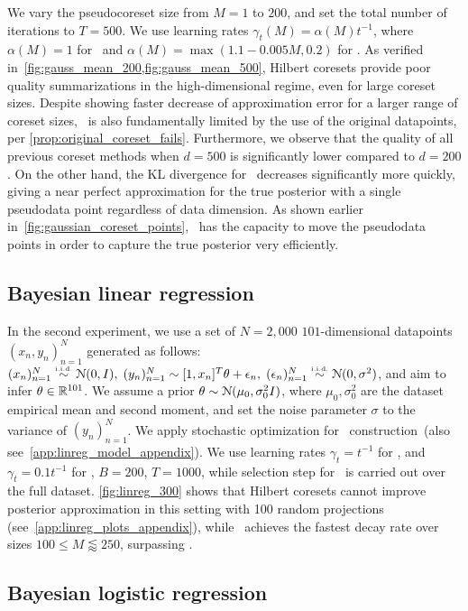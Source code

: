 %
We vary the pseudocoreset size from $M=1$ to $200$, and set the total number of
iterations to $ T =  500$. We use learning rates $ \gamma_t(M) = \alpha(M)
t^{-1}$, where  $ \alpha(M) = 1 $ for \sparsevi~and $ \alpha(M) = \max(1.1 - 0.005M, 0.2)
$ for \psvi.  As verified in~\cref{fig:gauss_mean_200,fig:gauss_mean_500},
Hilbert coresets provide poor quality summarizations in the high-dimensional
regime, even for large coreset sizes.  Despite showing faster decrease of
approximation error for a larger range of coreset sizes, \sparsevi~is also
fundamentally limited by the use of the original datapoints, per
\cref{prop:original_coreset_fails}.  Furthermore, we observe that the quality of all
previous coreset methods when $d=500$ is significantly lower
compared to $d=200$. On the other hand, the KL divergence for  \psvi~decreases
significantly more quickly, giving a near perfect approximation for the true
posterior with a single pseudodata point regardless of data dimension. As
shown earlier in~\cref{fig:gaussian_coreset_points}, \psvi~has the capacity to move the
pseudodata points in order to capture the
true posterior very efficiently. 

\subsection{Bayesian linear regression}
\label{section:linreg_experiment}
In the second experiment, we use a set of ${N=2,000}$ 
$101$-dimensional datapoints $(x_n,y_n)_{n=1}^{N}$ generated as follows: $(x_n)_{n=1}^N  \distiid \distNorm(0, I),\; (y_n)_{n=1}^N  \dist [1, x_n]^T\theta + \epsilon_n,\;  (\epsilon_n)_{n=1}^{N} \distiid \distNorm(0, \sigma^2)$, and aim to infer $\theta \in \mathbb{R}^{101}$. We assume a prior $\theta \sim \mathcal{N}(\mu_0,\sigma_0^2 I)$, where $ \mu_0, \sigma_0^2$ are the dataset empirical mean and second moment, and set the noise parameter $ \sigma$ to the variance of $(y_n)_{n=1}^{N}$. We apply stochastic optimization for \psvi~construction~(also see~\cref{app:linreg_model_appendix}). We use learning rates $\gamma_t = t^{-1}$ for \sparsevi, and $\gamma_t = 0.1t^{-1}$ for \psvi, $B=200$, $T=1000$, while selection step for \sparsevi~is carried out over the full dataset. \cref{fig:linreg_300} shows that Hilbert coresets cannot improve posterior approximation in this setting with 100 random projections (see~\cref{app:linreg_plots_appendix}), 
while \psvi~achieves the fastest decay rate over sizes $ 100 \leq M \lessapprox 250$, surpassing \sparsevi.

\subsection{Bayesian logistic regression}
\label{section:logreg_experiment}


